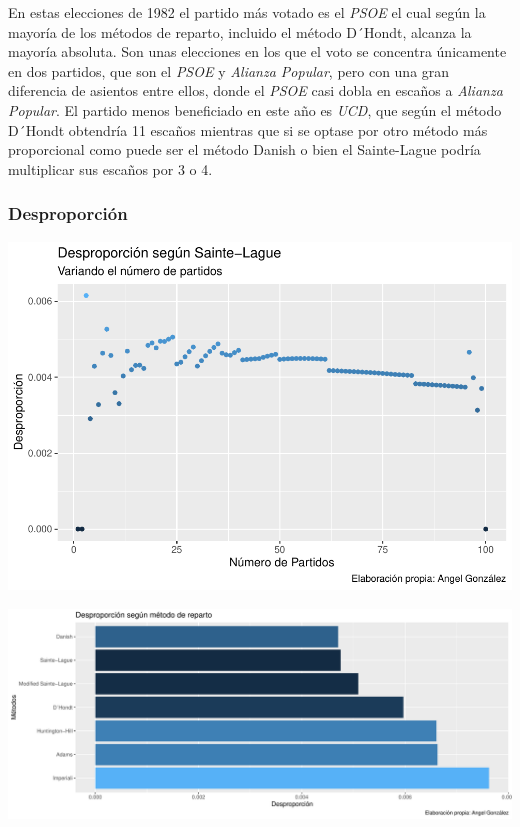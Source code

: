 \documentclass[12pt,a4paper,]{book}
\numberwithin{dummy}{section}
\theoremstyle{ocrenumbox}
\theoremstyle{blacknumex}
\theoremstyle{blacknumbox}
\theoremstyle{ocrenum}
\theoremstyle{ocrenum}
\begin{document}
En estas elecciones de 1982 el partido más votado es el \emph{PSOE} el
cual según la mayoría de los métodos de reparto, incluido el método
D´Hondt, alcanza la mayoría absoluta. Son unas elecciones en los que el
voto se concentra únicamente en dos partidos, que son el \emph{PSOE} y
\emph{Alianza Popular}, pero con una gran diferencia de asientos entre
ellos, donde el \emph{PSOE} casi dobla en escaños a \emph{Alianza
Popular}. El partido menos beneficiado en este año es \emph{UCD}, que
según el método D´Hondt obtendría 11 escaños mientras que si se optase
por otro método más proporcional como puede ser el método Danish o bien
el Sainte-Lague podría multiplicar sus escaños por 3 o 4.

\hypertarget{desproporciuxf3n-2}{%
\subsubsection{Desproporción}\label{desproporciuxf3n-2}}

\begin{center}\includegraphics[width=1\linewidth]{figurasR/unnamed-chunk-12-1} \end{center}

\begin{center}\includegraphics[width=1\linewidth]{figurasR/unnamed-chunk-12-2} \end{center}
\end{document}
